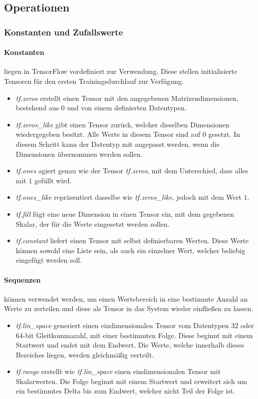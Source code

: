 \subsection{Operationen}

\subsubsection{Konstanten und Zufallswerte}

\paragraph{Konstanten} liegen in TensorFlow vordefiniert zur Verwendung.
Diese stellen initialisierte Tensoren für den ersten Trainingsdurchlauf zur Verfügung.

\begin{itemize}
	\item \textit{tf.zeros} erstellt einen Tensor mit den angegebenen Matrizendimensionen, bestehend aus $0$ und von einem definierten Datentypen. 
	\item \textit{tf.zeros\_like} gibt einen Tensor zurück, welcher dieselben Dimensionen wiedergegeben besitzt.
	Alle Werte in diesem Tensor sind auf $0$ gesetzt.
	In diesem Schritt kann der Datentyp mit angepasst werden, wenn die Dimensionen übernommen werden sollen.
	\item \textit{tf.ones} agiert genau wie der Tensor \textit{tf.zeros}, mit dem Unterschied, dass alles mit $1$ gefüllt wird.
	\item \textit{tf.ones\_like} repräsentiert dasselbe wie \textit{tf.zeros\_like}, jedoch mit dem Wert $1$.
	\item \textit{tf.fill} fügt eine neue Dimension in einen Tensor ein, mit dem gegebenen Skalar, der für die Werte eingesetzt werden sollen.
	\item \textit{tf.constant} liefert einen Tensor mit selbst definierbaren Werten. 
	Diese Werte können sowohl eine Liste sein, als auch ein einzelner Wert, welcher beliebig eingefügt werden soll. 
\end{itemize}

\paragraph{Sequenzen} können verwendet werden, um einen Wertebereich in eine bestimmte Anzahl an Werte zu zerteilen und diese als Tensor in das System wieder einfließen zu lassen.

\begin{itemize}
	\item \textit{tf.lin\_space} generiert einen eindimensionalen Tensor vom Datentypen $32$ oder $64$-bit Gleitkommazahl, mit einer bestimmten Folge.
	Diese beginnt mit einem Startwert und endet mit dem Endwert. 
	Die Werte, welche innerhalb dieses Bereiches liegen, werden gleichmäßig verteilt. 
	\item \textit{tf.range} erstellt wie \textit{tf.lin\_space} einen eindimensionalen Tensor mit Skalarwerten. 
	Die Folge beginnt mit einem Startwert und erweitert sich um ein bestimmtes Delta bis zum Endwert, welcher nicht Teil der Folge ist. 
\end{itemize}

